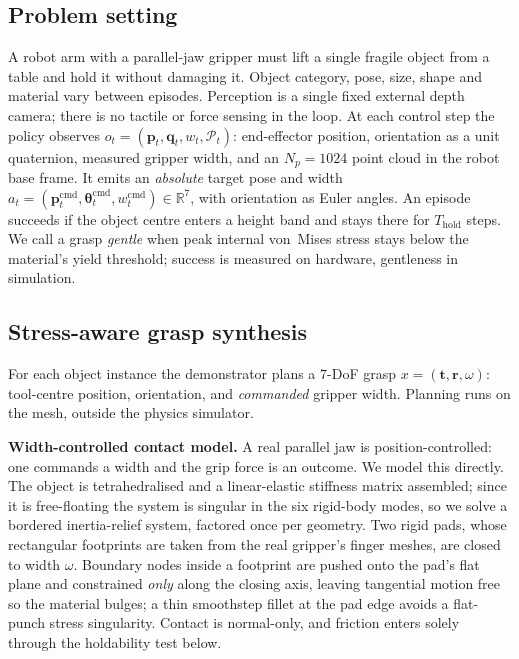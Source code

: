 \subsection{Problem setting}
\label{sec:method:problem}
A robot arm with a parallel-jaw gripper must lift a single fragile object from a table and hold
it without damaging it. Object category, pose, size, shape and material vary between episodes.
Perception is a single fixed external depth camera; there is no tactile or force sensing in the
loop. At each control step the policy observes
$o_t = (\mathbf{p}_t, \mathbf{q}_t, w_t, \mathcal{P}_t)$: end-effector position, orientation as
a unit quaternion, measured gripper width, and an $N_p\!=\!1024$ point cloud in the robot base
frame. It emits an \emph{absolute} target pose and width
$a_t = (\mathbf{p}^{\mathrm{cmd}}_t, \boldsymbol{\theta}^{\mathrm{cmd}}_t, w^{\mathrm{cmd}}_t)
\in \mathbb{R}^{7}$, with orientation as Euler angles. An episode succeeds if the object centre
enters a height band and stays there for $T_{\mathrm{hold}}$ steps. We call a grasp
\emph{gentle} when peak internal von~Mises stress stays below the material's yield threshold;
success is measured on hardware, gentleness in simulation.

\subsection{Stress-aware grasp synthesis}
\label{sec:method:synth}
For each object instance the demonstrator plans a $7$-DoF grasp
$x=(\mathbf{t},\mathbf{r},\omega)$: tool-centre position, orientation, and \emph{commanded}
gripper width. Planning runs on the mesh, outside the physics simulator.

\noindent\textbf{Width-controlled contact model.}
A real parallel jaw is position-controlled: one commands a width and the grip force is an
outcome. We model this directly. The object is tetrahedralised and a linear-elastic stiffness
matrix assembled; since it is free-floating the system is singular in the six rigid-body modes,
so we solve a bordered inertia-relief system, factored once per geometry. Two rigid pads, whose
rectangular footprints are taken from the real gripper's finger meshes, are closed to width
$\omega$. Boundary nodes inside a footprint are pushed onto the pad's flat plane and constrained
\emph{only} along the closing axis, leaving tangential motion free so the material bulges; a
thin smoothstep fillet at the pad edge avoids a flat-punch stress singularity. Contact is
normal-only, and friction enters solely through the holdability test below.


